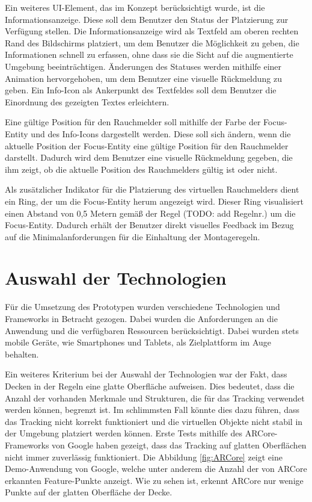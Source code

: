 Ein weiteres UI-Element, das im Konzept berücksichtigt wurde, ist die Informationsanzeige. Diese soll dem Benutzer den Status der Platzierung zur Verfügung stellen. Die Informationsanzeige wird als Textfeld am oberen rechten Rand des Bildschirms platziert, um dem Benutzer die Möglichkeit zu geben, die Informationen schnell zu erfassen, ohne dass sie die Sicht auf die augmentierte Umgebung beeinträchtigen. Änderungen des Statuses werden mithilfe einer Animation hervorgehoben, um dem Benutzer eine visuelle Rückmeldung zu geben. Ein Info-Icon als Ankerpunkt des Textfeldes soll dem Benutzer die Einordnung des gezeigten Textes erleichtern.

Eine gültige Position für den Rauchmelder soll mithilfe der Farbe der Focus-Entity und des Info-Icons dargestellt werden. Diese soll sich ändern, wenn die aktuelle Position der Focus-Entity eine gültige Position für den Rauchmelder darstellt. Dadurch wird dem Benutzer eine visuelle Rückmeldung gegeben, die ihm zeigt, ob die aktuelle Position des Rauchmelders gültig ist oder nicht. 

Als zusätzlicher Indikator für die Platzierung des virtuellen Rauchmelders dient ein Ring, der um die Focus-Entity herum angezeigt wird. Dieser Ring visualisiert einen Abstand von 0,5 Metern gemäß der Regel (TODO: add Regelnr.) um die Focus-Entity. Dadurch erhält der Benutzer direkt visuelles Feedback im Bezug auf die Minimalanforderungen für die Einhaltung der Montageregeln.

\section{Auswahl der Technologien}

Für die Umsetzung des Prototypen wurden verschiedene Technologien und Frameworks in Betracht gezogen. Dabei wurden die Anforderungen an die Anwendung und die verfügbaren Ressourcen berücksichtigt. Dabei wurden stets mobile Geräte, wie Smartphones und Tablets, als Zielplattform im Auge behalten. 

Ein weiteres Kriterium bei der Auswahl der Technologien war der Fakt, dass Decken in der Regeln eine glatte Oberfläche aufweisen. Dies bedeutet, dass die Anzahl der vorhanden Merkmale und Strukturen, die für das Tracking verwendet werden können, begrenzt ist. Im schlimmsten Fall könnte dies dazu führen, dass das Tracking nicht korrekt funktioniert und die virtuellen Objekte nicht stabil in der Umgebung platziert werden können. Erste Tests mithilfe des ARCore-Frameworks von Google haben gezeigt, dass das Tracking auf glatten Oberflächen nicht immer zuverlässig funktioniert. Die Abbildung \ref{fig:ARCore} zeigt eine Demo-Anwendung von Google, welche unter anderem die Anzahl der von ARCore erkannten Feature-Punkte anzeigt. Wie zu sehen ist, erkennt ARCore nur wenige Punkte auf der glatten Oberfläche der Decke. 

